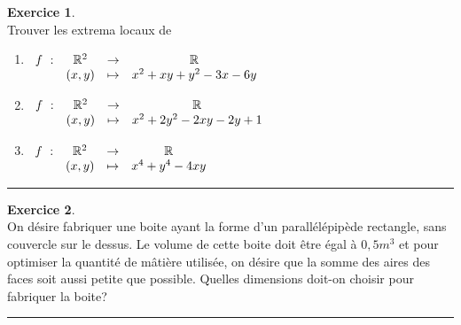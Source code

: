 \documentclass[a4paper,10pt]{article}
\theoremstyle{definition}
\theoremstyle{definition}
\newtheorem{exo}{Exercice}
\newcommand{\R}{\mathbb{R}}
\begin{document}
\begin{minipage}{1\linewidth}
\begin{minipage}[t]{0.48\linewidth}
		
		\begin{exo}\quad\\[0.2cm]
			Trouver les extrema locaux de 
			
			\begin{enumerate}
				\item  $\begin{array}[t]{cccc}
				f~:&\R^2&\rightarrow&\R\\
				&(x,y)&\mapsto&x^2+xy+y^2-3x-6y
				\end{array}$ 
				\item  $\begin{array}[t]{cccc}
				f~:&\R^2&\rightarrow&\R\\
				&(x,y)&\mapsto&x^2+2y^2-2xy-2y+1
				\end{array}$
				\item  $\begin{array}[t]{cccc}
				f~:&\R^2&\rightarrow&\R\\
				&(x,y)&\mapsto&x^4+y^4-4xy
				\end{array}$ 
			\end{enumerate}
			
			\centering
			\rule{1\linewidth}{0.6pt}
		\end{exo}
		
		
		\begin{exo}\quad\\[0.2cm] %
			On désire fabriquer une boite ayant la forme d'un parallélépipède rectangle, sans couvercle sur le dessus. Le volume de cette boite doit être égal à $0,5m^3$ et pour optimiser la quantité de mâtière utilisée, on désire que la somme des aires des faces soit aussi petite que possible. Quelles dimensions doit-on choisir pour fabriquer la boite?
			
			\centering
			\rule{1\linewidth}{0.6pt}
		\end{exo}
		
			
		
		
		
		
		
		
		
	\end{minipage}
\end{minipage}
\end{document}
